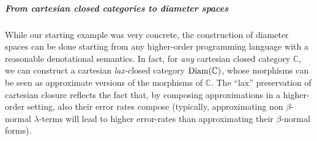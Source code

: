 %
%
%
%
%
%
%
%
%
% 
%
%
%
%
%
%
%





%
\subparagraph*{From cartesian closed categories to diameter spaces}
While our starting example was very concrete, the construction of diameter spaces can be 
done starting from any higher-order programming language with a reasonable denotational semantics. In fact, for \emph{any} cartesian closed category $\mathbb C$, we can construct a cartesian \emph{lax-}closed category $\operatorname{Diam}(\mathbb C)$, whose morphisms can be seen as approximate versions  of the morphisms of $\mathbb C$. The ``lax'' preservation of cartesian closure reflects the fact that, by composing approximations in a higher-order setting, also their error rates compose (typically, approximating non $\beta$-normal $\lambda$-terms will lead to higher error-rates than approximating their $\beta$-normal forms). 



